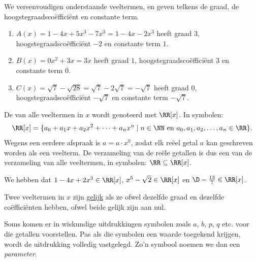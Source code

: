 \documentclass{ximera}
\begin{document}
\begin{example}
We vereenvoudigen onderstaande veeltermen, en geven telkens de graad, de hoogstegraadsco\"effici\"ent en constante term.
\begin{enumerate}

\item
$A(x) = 1-4x+5x^3-7x^3 = 1 - 4x - 2x^3$ heeft graad $3$, hoogstegraadsco\"effici\"ent $-2$ en constante term $1$.
\item
$B(x) = 0x^2 + 3x = 3x$ heeft graad $1$, hoogstegraadsco\"effici\"ent $3$ en constante term $0$.
\item
$C(x) = \sqrt{7}-\sqrt{28} = \sqrt{7}-2\sqrt{7} = -\sqrt{7}$ heeft graad $0$, hoogstegraadsco\"effici\"ent $-\sqrt{7}$ en constante term $-\sqrt{7}$.
\end{enumerate}
\end{example}

De  van alle veeltermen in $x$ wordt genoteerd met $\RR[x]$. In symbolen:
\[
\RR[x] = \{a_0 + a_1 x + a_2 x^2 + \dots + a_n x^n \mid \text{$n \in \NN$ en $a_0,a_1,a_2,\ldots,a_n \in \RR$} \}.
\]
Wegens een eerdere afspraak is $a = a\cdot x^0$, zodat elk re\"eel getal $a$ kan geschreven worden als een veelterm. De verzameling van de re\"ele getallen is dus een 
van de verzameling van alle veeltermen, in symbolen: $\RR \subseteq \RR[x]$. 

\begin{example} We hebben dat $1-4x+2x^3 \in \RR[x]$, $x^5-\sqrt{2} \in \RR[x]$ en $\D -\frac{13}{7} \in \RR[x]$.   
\end{example}

Twee veeltermen in $x$ zijn \underline{gelijk} als ze ofwel dezelfde graad en dezelfde co\"effici\"enten hebben, ofwel beide gelijk zijn aan nul. 

Soms komen er in wiskundige uitdrukkingen symbolen zoals $a$, $b$, $p$, $q$ etc. voor die getallen voorstellen. Pas als die symbolen een waarde toegekend krijgen, wordt de uitdrukking volledig vastgelegd. Zo'n symbool noemen we dan een {\em parameter}. 
\end{document}
